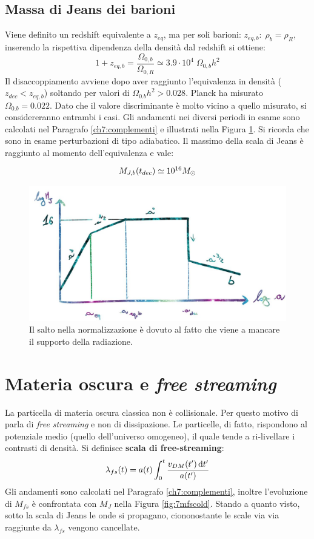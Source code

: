 \subsection{Massa di Jeans dei barioni}
Viene definito un redshift equivalente a $z_{eq}$, ma per soli barioni: $z_{eq,b}: \; \rho_b=\rho_R$, inserendo la rispettiva dipendenza della densità dal redshift si ottiene:
\begin{equation}
    1+z_{eq,b}=\frac{\Omega_{0,b}}{\Omega_{0,R}}\simeq 3.9\cdot 10^4\; \Omega_{0,b}h^2
\end{equation}
Il disaccoppiamento avviene dopo aver raggiunto l'equivalenza in densità ($z_{dec}<z_{eq,b}$) soltando per valori di $\Omega_{0.b}h^2 > 0.028$. Planck ha misurato $\Omega_{0.b}= 0.022$. Dato che il valore discriminante è molto vicino a quello misurato, si considereranno entrambi i casi. Gli andamenti nei diversi periodi in esame sono calcolati nel Paragrafo \ref{ch7:complementi} e illustrati nella Figura \ref{fig:7mjbar}. Si ricorda che sono in esame perturbazioni di tipo adiabatico. Il massimo della scala di Jeans è raggiunto al momento dell'equivalenza e vale:
\begin{equation}\left.
    \def\arraystretch{1.3}
        \begin{array}{l}
     M_{J,b} (t_{dec}) \simeq 10^{16} M_\odot\\
    \end{array}\right.
\end{equation}
\begin{figure}[H]
    \centering
    \includegraphics[width=.8 \textwidth]{Pictures/7/mjbar.jpg}
    \caption{Il salto nella normalizzazione è dovuto al fatto che viene a mancare il supporto della radiazione.}\label{fig:7mjbar}
\end{figure}

\section{Materia oscura e \textit{free streaming}}
La particella di materia oscura classica non è collisionale. Per questo motivo di parla di \textit{free streaming} e non di dissipazione. Le particelle, di fatto, rispondono al potenziale medio (quello dell'universo omogeneo), il quale tende a ri-livellare i contrasti di densità. Si definisce \textbf{scala di free-streaming}:
$$
\lambda_{fs}(t) = a(t)\int_0^t \frac{v_{DM}(t')\operatorname{d}\!{t'}}{a(t')}
$$
Gli andamenti sono calcolati nel Paragrafo \ref{ch7:complementi}, inoltre l'evoluzione di $M_{fs}$ è confrontata con $M_J$ nella Figura \ref{fig:7mfscold}. Stando a quanto visto, sotto la scala di Jeans le onde si propagano, ciononostante le scale via via raggiunte da $\lambda_{fs}$ vengono cancellate.

